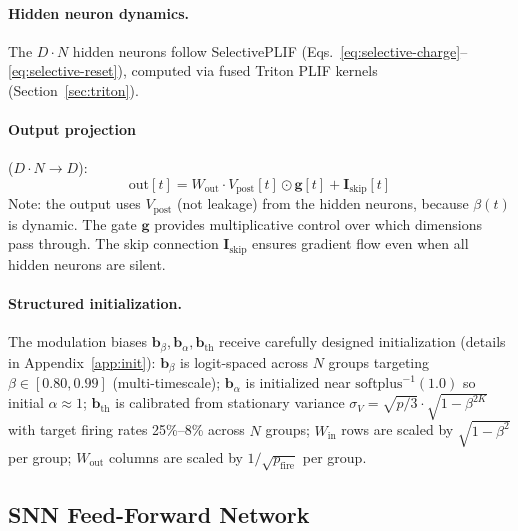 \documentclass{article}
\newcommand{\vpost}{V_{\text{post}}}
\begin{document}
\paragraph{Hidden neuron dynamics.}
The $D \cdot N$ hidden neurons follow SelectivePLIF (Eqs.~\ref{eq:selective-charge}--\ref{eq:selective-reset}), computed via fused Triton PLIF kernels (Section~\ref{sec:triton}).

\paragraph{Output projection} ($D \cdot N \to D$):
\begin{equation}
    \text{out}[t] = W_{\text{out}} \cdot \vpost[t] \odot \mathbf{g}[t] + \mathbf{I}_{\text{skip}}[t]
    \label{eq:block-out}
\end{equation}
Note: the output uses $\vpost$ (not leakage) from the hidden neurons, because $\beta(t)$ is dynamic.
The gate $\mathbf{g}$ provides multiplicative control over which dimensions pass through.
The skip connection $\mathbf{I}_{\text{skip}}$ ensures gradient flow even when all hidden neurons are silent.

\paragraph{Structured initialization.}
The modulation biases $\mathbf{b}_\beta, \mathbf{b}_\alpha, \mathbf{b}_{\text{th}}$ receive carefully designed initialization (details in Appendix~\ref{app:init}):
$\mathbf{b}_\beta$ is logit-spaced across $N$ groups targeting $\beta \in [0.80, 0.99]$ (multi-timescale);
$\mathbf{b}_\alpha$ is initialized near $\text{softplus}^{-1}(1.0)$ so initial $\alpha \approx 1$;
$\mathbf{b}_{\text{th}}$ is calibrated from stationary variance $\sigma_V = \sqrt{p/3} \cdot \sqrt{1 - \beta^{2K}}$ with target firing rates 25\%--8\% across $N$ groups;
$W_{\text{in}}$ rows are scaled by $\sqrt{1 - \beta^2}$ per group;
$W_{\text{out}}$ columns are scaled by $1/\sqrt{p_{\text{fire}}}$ per group.

\subsection{SNN Feed-Forward Network}
\label{sec:snn-ffn}
\end{document}
